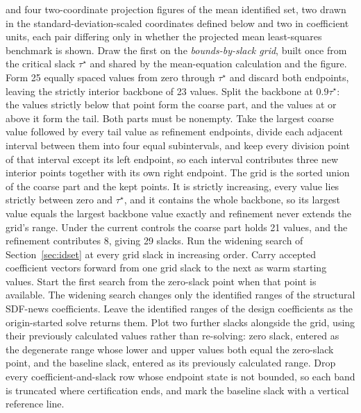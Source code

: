 \documentclass[11pt]{article}
\begin{document}
\begin{enumerate}
and four two-coordinate projection figures of the mean identified set, two drawn in the
standard-deviation-scaled coordinates defined below and two in coefficient units, each pair
differing only in whether the projected mean least-squares benchmark is shown. Draw the first on the \emph{bounds-by-slack
grid}, built once from the critical slack \(\tau^\star\) and shared by the mean-equation calculation and
the figure. Form 25 equally spaced values from zero through \(\tau^\star\) and discard both
endpoints, leaving the strictly interior backbone of 23 values. Split the backbone at
\(0.9\tau^\star\): the values strictly below that point form the coarse part, and the values at or
above it form the tail. Both parts must be nonempty. Take the largest coarse value followed by every
tail value as refinement endpoints, divide each adjacent interval between them into four equal
subintervals, and keep every division point of that interval except its left endpoint, so each
interval contributes three new interior points together with its own right endpoint. The grid is the
sorted union of the coarse part and the kept points. It is strictly increasing, every value lies
strictly between zero and \(\tau^\star\), and it contains the whole backbone, so its largest value
equals the largest backbone value exactly and refinement never extends the grid's range. Under the
current controls the coarse part holds 21 values, and the refinement contributes 8, giving 29 slacks.
Run the widening search of Section~\ref{sec:idset} at every grid slack in increasing order. Carry
accepted coefficient vectors forward from one grid slack to the next as warm starting values. Start
the first search from the zero-slack point when that point is available. The widening search changes
only the identified ranges of the structural SDF-news coefficients. Leave the identified ranges of
the design coefficients as the origin-started solve returns them.
Plot two further slacks alongside the grid, using their previously calculated values rather than re-solving: zero
slack, entered as the degenerate range whose lower and upper values both equal the zero-slack point,
and the baseline slack, entered as its previously calculated range. Drop every coefficient-and-slack
row whose endpoint state is not bounded, so each band is truncated where certification ends, and mark
the baseline slack with a vertical reference line.


\end{enumerate}
\end{document}
